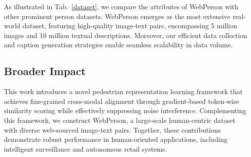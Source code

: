  As illustrated in Tab.~\ref{dataset}, we compare the attributes of WebPerson with other prominent person datasets. WebPerson emerges as the most extensive real-world dataset, featuring high-quality image-text pairs, encompassing 5 million images and 10 million textual descriptions. Moreover, our efficient data collection and caption generation strategies enable seamless scalability in data volume.

\subsection{Broader Impact}
\label{broad_impact}
This work introduces a novel pedestrian representation learning framework that achieves fine-grained cross-modal alignment through gradient-based token-wise similarity scoring while effectively suppressing noise interference. Complementing this framework, we construct WebPerson, a large-scale human-centric dataset with diverse web-sourced image-text pairs. Together, these contributions demonstrate robust performance in human-oriented applications, including intelligent surveillance and autonomous retail systems.
